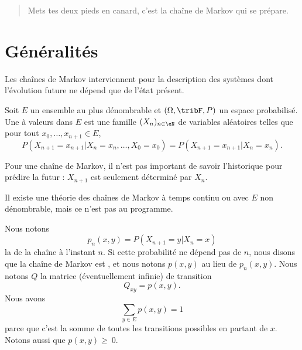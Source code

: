 
\begin{quote}
    Mets tes deux pieds en canard, c'est la chaîne de Markov qui se prépare.
\end{quote}

\section{Généralités}

Les chaînes de Markov interviennent pour la description des systèmes dont l'évolution future ne dépend que de l'état présent.

\begin{definition}
    Soit \( E\) un ensemble au plus dénombrable et \( (\Omega,\tribF,P)\) un espace probabilisé. Une  à valeurs dans \( E\) est une famille \( (X_n)_{n\in\eN}\) de variables aléatoires telles que pour tout \( x_0,\ldots,x_{n+1}\in E\),
    \begin{equation}
        P(X_{n+1}=x_{n+1}|X_n=x_n,\ldots,X_0=x_0)=P(X_{n+1}=x_{n+1}|X_n=x_n).
    \end{equation}
\end{definition}
Pour une chaîne de Markov, il n'est pas important de savoir l'historique pour prédire la futur : \( X_{n+1}\) est seulement déterminé par \( X_n\).

\begin{remark}
    Il existe une théorie des chaînes de Markov à temps continu ou avec \( E\) non dénombrable, mais ce n'est pas au programme.
\end{remark}

Nous notons
\begin{equation}
    p_n(x,y)=P(X_{n+1}=y|X_n=x)
\end{equation}
la  de la chaîne à l'instant \( n\). Si cette probabilité ne dépend pas de \( n\), nous disons que la chaîne de Markov est , et nous notons \( p(x,y)\) au lieu de \( p_n(x,y)\). Nous notons \( Q\) la matrice (éventuellement infinie) de transition
\begin{equation}
    Q_{xy}=p(x,y).
\end{equation}
Nous avons
\begin{equation}
    \sum_{y\in E}p(x,y)=1
\end{equation}
parce que c'est la somme de toutes les transitions possibles en partant de \( x\). Notons aussi que \( p(x,y)\geq~0\).

